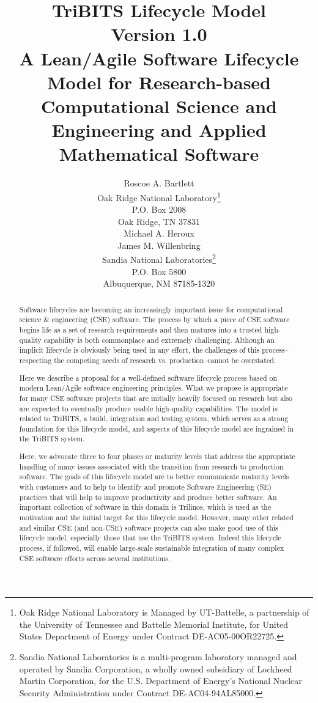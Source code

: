 \documentclass[11pt]{SANDreport}
\title{
TriBITS Lifecycle Model \\[2ex] Version 1.0 \\[2ex] \large A
Lean/Agile Software Lifecycle Model for Research-based Computational
Science and Engineering and Applied Mathematical Software }
\author{
Roscoe A. Bartlett \\ Oak Ridge National Laboratory\footnote{Oak
Ridge National Laboratory is Managed by UT-Battelle, a partnership
of the University of Tennessee and Battelle Memorial Institute, for
United States Department of Energy under Contract DE-AC05-00OR22725.}
\\P.O. Box 2008 \\ Oak Ridge, TN 37831
\\[2ex] Michael A. Heroux \\ James M. Willenbring \\ Sandia
National Laboratories\footnote{Sandia National Laboratories is a 
multi-program laboratory managed and operated by Sandia Corporation, 
a wholly owned subsidiary of Lockheed Martin Corporation, for the U.S.
Department of Energy’s National Nuclear Security Administration
under Contract DE-AC04-94AL85000.} \\
P.O. Box 5800 \\
Albuquerque, NM 87185-1320 \\ }
\date{}
\begin{document}

\maketitle

%

%
\begin{abstract}
%

Software lifecycles are becoming an increasingly important issue for computational science \& engineering (CSE) software.  The process by which a piece of CSE software begins life as a set of research requirements and then matures into a trusted high-quality capability is both commonplace and extremely challenging.  Although an implicit lifecycle is obviously being used in any effort, the challenges of this process--respecting the competing needs of research vs. production--cannot be overstated.

Here we describe a proposal for a well-defined software lifecycle process based on modern Lean/Agile software engineering principles. What we propose is appropriate for many CSE software projects that are initially heavily focused on research but also are expected to eventually produce usable high-quality capabilities.  The model is related to TriBITS, a build, integration and testing system, which serves as a strong foundation for this lifecycle model, and aspects of this lifecycle model are ingrained in the TriBITS system.

Here, we advocate three to four phases or maturity levels that address
the appropriate handling of many issues associated with the transition
from research to production software.  The goals of this lifecycle
model are to better communicate maturity levels with customers and to
help to identify and promote Software Engineering (SE) practices that
will help to improve productivity and produce better software.  An
important collection of software in this domain is Trilinos, which is
used as the motivation and the initial target for this lifecycle
model.  However, many other related and similar CSE (and non-CSE)
software projects can also make good use of this lifecycle model,
especially those that use the TriBITS system.  Indeed this lifecycle
process, if followed, will enable large-scale sustainable integration
of many complex CSE software efforts across several institutions.

%
\end{abstract}
%
\end{document}
